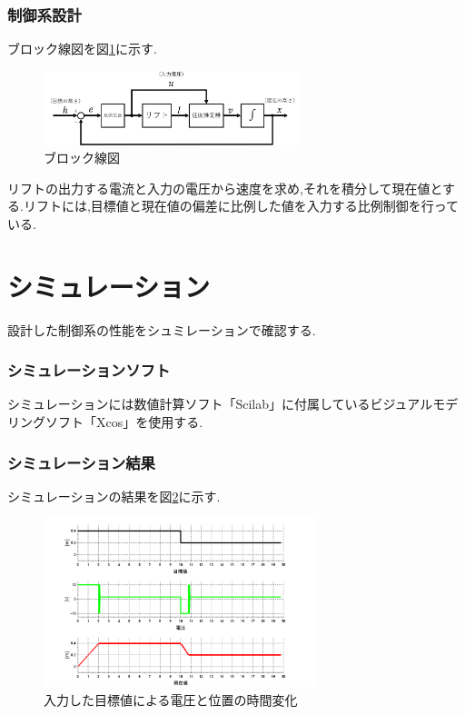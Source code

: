 \documentclass[twocolumn,11pt]{abst}
\begin{document}
\subsubsection{制御系設計}
ブロック線図を図\ref{fig:blocksenzu}に示す.

\begin{figure}[htbp]
  \begin{center}
    \includegraphics[width=75mm]{img/blocksenzu.png}
    \end{center}
  \caption{ブロック線図}
 \label{fig:blocksenzu}
\end{figure}

リフトの出力する電流と入力の電圧から速度を求め,それを積分して現在値とする.リフトには,目標値と現在値の偏差に比例した値を入力する比例制御を行っている.

\section{シミュレーション}
設計した制御系の性能をシュミレーションで確認する.

\subsubsection{シミュレーションソフト}
シミュレーションには数値計算ソフト「Scilab」に付属しているビジュアルモデリングソフト「Xcos」を使用する.%


\subsubsection{シミュレーション結果}
シミュレーションの結果を図\ref{fig:sim}に示す.

\begin{figure}[htbp]
 \begin{center}
    \includegraphics[width=80mm]{img/sim.bmp}
    \end{center}
  \caption{入力した目標値による電圧と位置の時間変化}
 \label{fig:sim}
\end{figure}
\end{document}
